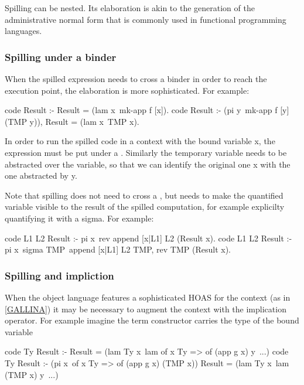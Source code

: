 \documentclass[a4paper, 11pt]{book}
\begin{document}
Spilling can be nested. Its elaboration is akin to the generation
of the administrative normal form that is commonly used in functional
programming languages.

\subsubsection{Spilling under a binder}

When the spilled expression needs to cross a binder in order to
reach the execution point, the elaboration is more sophisticated.
For example: 

\begin{elpicode}
code Result :- Result = (lam x\ {mk-app f [x]}).
code Result :- (pi y\ mk-app f [y] (TMP y)), Result = (lam x\ TMP x).
\end{elpicode}
  

In order to run the spilled code in a context with the bound variable
x, the expression must be put under a . Similarly
the temporary variable needs to be abstracted over the variable, so
that we can identify the original one x with the one abstracted by
 y.

Note that spilling does not need to cross a , but
needs to make the quantified variable visible to the result of
the spilled computation, for example explicilty quantifying it
with a sigma. For example:

\begin{elpicode}
  code L1 L2 Result :- pi x\ rev {append [x|L1] L2} (Result x).
  code L1 L2 Result :- pi x\ sigma TMP\ append [x|L1] L2 TMP, rev TMP (Result x).
\end{elpicode}

\subsubsection{Spilling and impliction}

When the object language features a sophisticated HOAS for the context
(as in \ref{GALLINA}) it may be necessary to augment the context with
the implication operator. For example imagine the 
term constructor carries the type of the bound variable

\begin{elpicode}
  code Ty Result :- Result = (lam Ty x\ lam {of x Ty => of (app g x)} y\ ...)
  code Ty Result :-
    (pi x\ of x Ty => of (app g x) (TMP x))
    Result = (lam Ty x\ lam (TMP x) y\ ...)
\end{elpicode}
\end{document}
